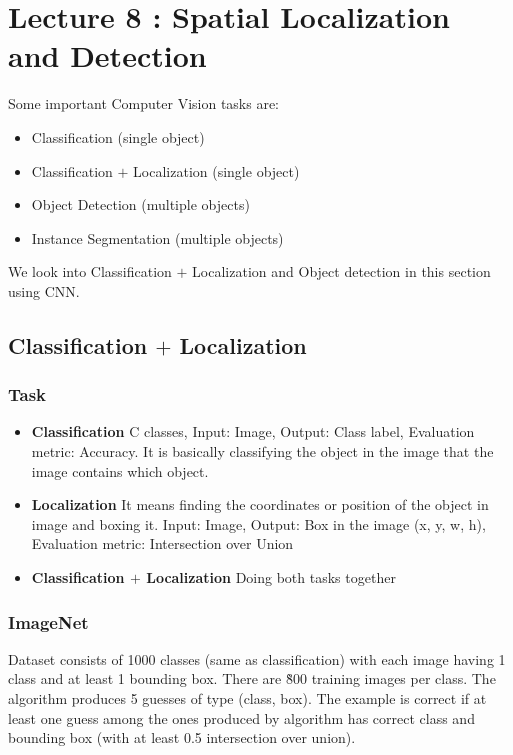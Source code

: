 \documentclass[12pt,a4paper]{article}
\begin{document}
\section{Lecture 8 : Spatial Localization and Detection}
Some important Computer Vision tasks are:
\begin{itemize}
    \item Classification (single object)
    \item Classification $+$ Localization (single object)
    \item Object Detection (multiple objects)
    \item Instance Segmentation (multiple objects)
\end{itemize}
We look into Classification $+$ Localization and Object detection in this section using CNN.
\subsection{Classification $+$ Localization}

\subsubsection{Task}
\begin{itemize}
    \item \textbf{Classification} C classes, Input: Image, Output: Class label, Evaluation metric: Accuracy. It is basically classifying the object in the image that the image contains which object.
    \item \textbf{Localization} It means finding the coordinates or position of the object in image and boxing it. Input: Image, Output: Box in the image (x, y, w, h), Evaluation metric: Intersection over Union
    \item \textbf{Classification $+$ Localization} Doing both tasks together
\end{itemize}

\subsubsection{ImageNet}
Dataset consists of 1000 classes (same as classification) with each image having 1 class and at least 1 bounding box. There are \~800 training images per class. The algorithm produces 5 guesses of type (class, box). The example is correct if at least one guess among the ones produced by algorithm has correct class and bounding box (with at least 0.5 intersection over union).
\end{document}
